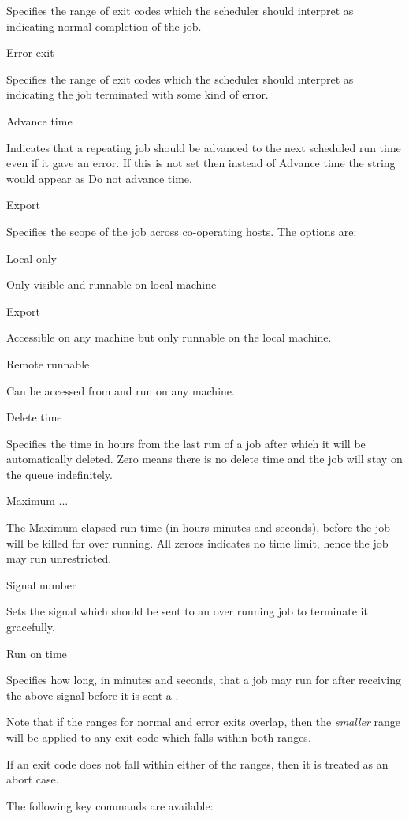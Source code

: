Specifies the range of exit codes which the scheduler should interpret as indicating normal completion of the job.

Error exit

Specifies the range of exit codes which the scheduler should interpret as indicating the job terminated with some kind of error.

Advance time

Indicates that a repeating job should be advanced to the next scheduled
run time even if it gave an error. If this is not set then instead of
Advance time the string would appear as Do not advance time.

Export

Specifies the scope of the job across co-operating \ProductName{} hosts. The
options are:

Local only

Only visible and runnable on local machine

Export

Accessible on any machine but only runnable on the local machine.

Remote runnable

Can be accessed from and run on any machine.

Delete time

Specifies the time in hours from the last run of a job after which it
will be automatically deleted. Zero means there is no delete time and
the job will stay on the queue indefinitely.

Maximum ...

The Maximum elapsed run time (in hours minutes and seconds), before the
job will be killed for over running. All zeroes indicates no time
limit, hence the job may run unrestricted.

Signal number

Sets the signal which should be sent to an over running job to terminate
it gracefully.

Run on time

Specifies how long, in minutes and seconds, that a job may run for after
receiving the above signal before it is sent a
.

Note that if the ranges for normal and error exits overlap, then the
\textit{smaller} range will be applied to any exit code which falls
within both ranges.

If an exit code does not fall within either of the ranges, then it is
treated as an abort case.

The following key commands are available:

